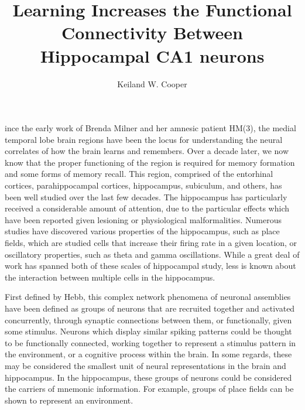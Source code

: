 \documentclass[9pt,twocolumn,twoside,lineno]{pnas-new}
\title{Learning Increases the Functional Connectivity Between Hippocampal CA1 neurons}
\author[a,b,1]{Keiland W. Cooper}
\affil[a]{Psychological and Brain Sciences, Indiana University Bloomington}
\affil[b]{Program in Cognitive Science, Indiana University Bloomington}
\begin{document}
\maketitle
\thispagestyle{firststyle}

ince the early work of Brenda Milner and her amnesic patient HM(3), the medial temporal lobe brain regions have been the locus for understanding the neural correlates of how the brain learns and remembers. Over a decade later, we now know that the proper functioning of the region is required for memory formation and some forms of memory recall. This region, comprised of the entorhinal cortices, parahippocampal cortices, hippocampus, subiculum, and others, has been well studied over the last few decades. The hippocampus has particularly received a considerable amount of attention, due to the particular effects which have been reported given lesioning or physiological malformalities. Numerous studies have discovered various properties of the hippocampus, such as place fields, which are studied cells that increase their firing rate in a given location, or oscillatory properties, such as theta and gamma oscillations. While a great deal of work has spanned both of these scales of hippocampal study, less is known about the interaction between multiple cells in the hippocampus.

First defined by Hebb, this complex network phenomena of neuronal assemblies have been defined as groups of neurons that are recruited together and activated concurrently, through synaptic connections between them, or functionally, given some stimulus. Neurons which display similar spiking patterns could be thought to be functionally connected, working together to represent a stimulus pattern in the environment, or a cognitive process within the brain. In some regards, these may be considered the smallest unit of neural representations in the brain and hippocampus. In the hippocampus, these groups of neurons could be considered the carriers of mnemonic information. For example, groups of place fields can be shown to represent an environment.
\end{document}

